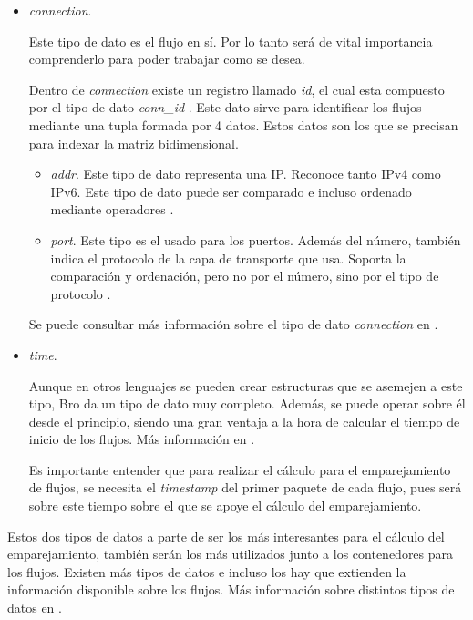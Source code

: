 \begin{itemize}

\item \textit{connection}. 

\intro Este tipo de dato es el flujo en sí. Por lo tanto será de vital importancia comprenderlo para poder trabajar como se desea.

\intro Dentro de \textit{connection} existe un registro llamado \textit{id}, el cual esta compuesto por el tipo de dato \textit{conn\_id} \cite{broconnid}. Este dato sirve para identificar los flujos mediante una tupla formada por 4 datos. Estos datos son los que se 
precisan para indexar la matriz bidimensional.

  \begin{itemize}

  \item \textit{addr}. Este tipo de dato representa una IP. Reconoce tanto IPv4 como IPv6. Este tipo de dato puede 
  ser comparado e incluso ordenado mediante operadores \cite{broaddr}.

  \item \textit{port}. Este tipo es el usado para los puertos. Además del número, también indica el 
  protocolo de la capa de transporte que usa. Soporta la comparación y ordenación, pero no por el número, sino por 
  el tipo de protocolo \cite{broport}.
  \end{itemize}
  
\intro Se puede consultar más información sobre el tipo de dato \textit{connection} en \cite{connectiontype}.

\item \textit{time}. 

\intro Aunque en otros lenguajes se pueden crear estructuras que se asemejen a este tipo, Bro da un tipo de dato muy completo. Además, 
se puede operar sobre él desde el principio, siendo una gran ventaja a la hora de calcular el tiempo de inicio de los flujos. Más 
información en \cite{timetype}.

\intro Es importante entender que para realizar el cálculo para el emparejamiento de flujos, se necesita el 
\textit{timestamp} del primer paquete de cada flujo, pues será sobre este tiempo sobre el que se apoye el 
cálculo del emparejamiento.

\end{itemize}

\intro Estos dos tipos de datos a parte de ser los más interesantes para el cálculo del emparejamiento, también 
serán los más utilizados junto a los contenedores para los flujos. Existen más tipos de datos e incluso los hay que 
extienden la información disponible sobre los flujos. Más información sobre distintos tipos de datos en \cite{conntype}.
